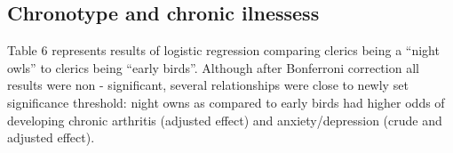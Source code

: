 \documentclass[ijerph,article,accept,moreauthors,pdftex]{mdpi}
\begin{document}
\hypertarget{chronotype-and-chronic-ilnessess}{%
\subsection{Chronotype and chronic
ilnessess}\label{chronotype-and-chronic-ilnessess}}

Table 6 represents results of logistic regression comparing clerics
being a ``night owls'' to clerics being ``early birds''. Although after
Bonferroni correction all results were non - significant, several
relationships were close to newly set significance threshold: night owns
as compared to early birds had higher odds of developing chronic
arthritis (adjusted effect) and anxiety/depression (crude and adjusted
effect).

\begin{table}[!h]


\end{table}
\end{document}
